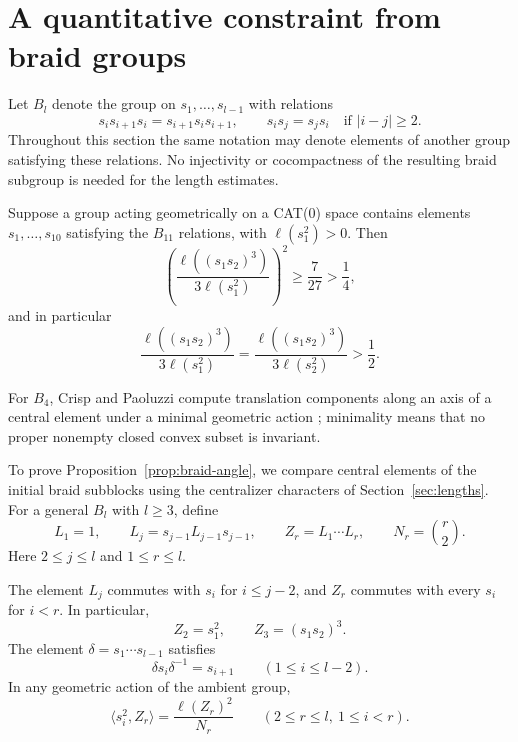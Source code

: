\section{A quantitative constraint from braid groups}\label{sec:braids}

Let $B_l$ denote the group on $s_1,\ldots,s_{l-1}$ with relations
\[
 s_i s_{i+1}s_i=s_{i+1}s_i s_{i+1},\qquad
 s_i s_j=s_j s_i\quad\text{if }|i-j|\ge2.
\]
Throughout this section the same notation may denote elements of another
group satisfying these relations.  No injectivity or cocompactness of
the resulting braid subgroup is needed for the length estimates.

\begin{proposition}\label{prop:braid-angle}
Suppose a group acting geometrically on a CAT(0) space contains elements
$s_1,\ldots,s_{10}$ satisfying the $B_{11}$ relations, with
$\ell(s_1^2)>0$.  Then
\begin{equation}\label{eq:braid-angle-bound}
 \left(\frac{\ell((s_1s_2)^3)}{3\ell(s_1^2)}\right)^2
 \ge\frac{7}{27}>\frac14,
\end{equation}
and in particular
\[
 \frac{\ell((s_1s_2)^3)}{3\ell(s_1^2)}
 =\frac{\ell((s_1s_2)^3)}{3\ell(s_2^2)}>\frac12.
\]
\end{proposition}

For $B_4$, Crisp and Paoluzzi compute translation components along an
axis of a central element under a minimal geometric action
\cite[Proposition~5]{CrispPaoluzzi2005}; minimality means that no proper
nonempty closed convex subset is invariant.

To prove Proposition~\ref{prop:braid-angle}, we compare central elements
of the initial braid subblocks using the centralizer characters of
Section~\ref{sec:lengths}.  For a general $B_l$ with $l\ge3$, define
\begin{equation}\label{eq:braid-centers-definition}
 L_1=1,\qquad L_j=s_{j-1}L_{j-1}s_{j-1},\qquad
 Z_r=L_1\cdots L_r,\qquad N_r=\binom r2.
\end{equation}
Here $2\le j\le l$ and $1\le r\le l$.

\begin{lemma}\label{lem:braid-centers}
The element $L_j$ commutes with $s_i$ for $i\le j-2$, and $Z_r$ commutes
with every $s_i$ for $i<r$.  In particular,
\[
 Z_2=s_1^2,\qquad Z_3=(s_1s_2)^3.
\]
The element $\delta=s_1\cdots s_{l-1}$ satisfies
\begin{equation}\label{eq:braid-shift}
 \delta s_i\delta^{-1}=s_{i+1}\qquad(1\le i\le l-2).
\end{equation}
In any geometric action of the ambient group,
\begin{equation}\label{eq:braid-central-pairing}
 \langle s_i^2,Z_r\rangle=\frac{\ell(Z_r)^2}{N_r}
 \qquad(2\le r\le l,\ 1\le i<r).
\end{equation}
\end{lemma}

